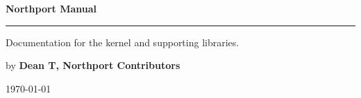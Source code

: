 \pagestyle{empty}


\begin{titlepage}
    \begin{flushleft}
    \vspace{1cm}
    \Huge
    \textbf{Northport Manual}

    \rule{\textwidth}{2pt}
    \large
    Documentation for the kernel and supporting libraries.

    \vspace{4cm}
    \Large
    \center{\drawlogo}
    \vfill
    
    \begin{flushright}
    \small
    by
    \large
    \textbf{Dean T, Northport Contributors}
    
    \normalsize
    \today
    \end{flushright}

    \end{flushleft}
\end{titlepage}

\newpage
{}
{
    \hypersetup{linkcolor=black}
    \tableofcontents
}
\restoregeometry
\newpage
{}
\pagestyle{fancy}
